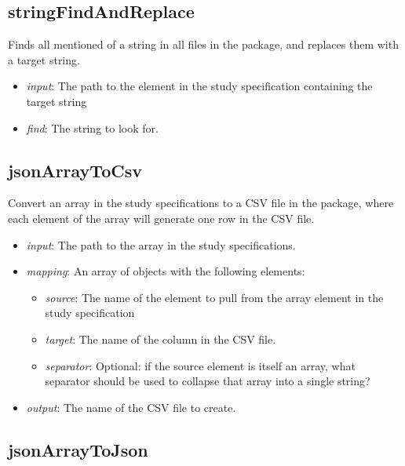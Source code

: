 \documentclass[]{article}
\providecommand{\tightlist}{%
  \setlength{\itemsep}{0pt}\setlength{\parskip}{0pt}}
\begin{document}
\hypertarget{stringfindandreplace}{%
\subsection{stringFindAndReplace}\label{stringfindandreplace}}

Finds all mentioned of a string in all files in the package, and
replaces them with a target string.

\begin{itemize}
\tightlist
\item
  \emph{input}: The path to the element in the study specification
  containing the target string
\item
  \emph{find}: The string to look for.
\end{itemize}

\hypertarget{jsonarraytocsv}{%
\subsection{jsonArrayToCsv}\label{jsonarraytocsv}}

Convert an array in the study specifications to a CSV file in the
package, where each element of the array will generate one row in the
CSV file.

\begin{itemize}
\tightlist
\item
  \emph{input}: The path to the array in the study specifications.
\item
  \emph{mapping}: An array of objects with the following elements:

  \begin{itemize}
  \tightlist
  \item
    \emph{source}: The name of the element to pull from the array
    element in the study specification
  \item
    \emph{target}: The name of the column in the CSV file.
  \item
    \emph{separator}: Optional: if the source element is itself an
    array, what separator should be used to collapse that array into a
    single string?
  \end{itemize}
\item
  \emph{output}: The name of the CSV file to create.
\end{itemize}

\hypertarget{jsonarraytojson}{%
\subsection{jsonArrayToJson}\label{jsonarraytojson}}
\end{document}
